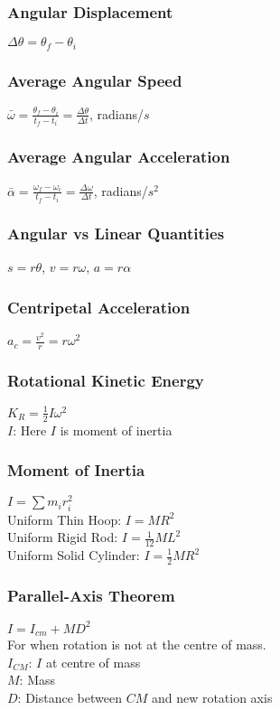 \documentclass[10 pt]{article}
\begin{document}
\begin{multicols}{2}
\subsubsection*{Angular Displacement}
$\Delta \theta = \theta_f - \theta_i$
\subsubsection*{Average Angular Speed}
$\bar \omega = \frac{\theta_f - \theta_i}{t_f - t_i} = \frac{\Delta \theta}{\Delta t}$, radians/$s$
\subsubsection*{Average Angular Acceleration}
$\bar \alpha = \frac{\omega_f - \omega_i}{t_f - t_i} = \frac{\Delta \omega}{\Delta t}$, radians/$s^2$
\subsubsection*{Angular vs Linear Quantities}
$s = r\theta$, $v = r\omega$, $a = r\alpha$
\subsubsection*{Centripetal Acceleration}
$a_c = \frac{v^2}{r} = r\omega^2$
\subsubsection*{Rotational Kinetic Energy}
$K_R = \frac{1}{2}I\omega^2$ \\
$I$: Here $I$ is moment of inertia
\subsubsection*{Moment of Inertia}
$I = \sum m_i r_i^2$\\
Uniform Thin Hoop: $I = MR^2$ \\
Uniform Rigid Rod: $I = \frac{1}{12}ML^2$ \\
Uniform Solid Cylinder: $I = \frac{1}{2}MR^2$
\subsubsection*{Parallel-Axis Theorem}
$I = I_{cm} + MD^2$ \\
For when rotation is not at the centre of mass. \\
$I_{CM}$: $I$ at centre of mass\\
$M$: Mass \\
$D$: Distance between $CM$ and new rotation axis

\end{multicols}
\end{document}
